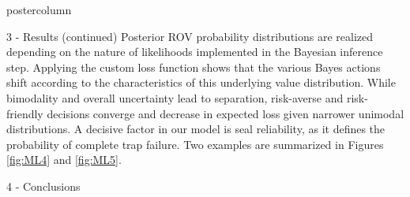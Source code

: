 \documentclass{beamer}
\begin{document}
\begin{frame}
\begin{columns}
\begin{column}{.249\textwidth}
\begin{beamercolorbox}[center]{postercolumn}
\begin{minipage}{.98\textwidth}
{\begin{myblock}{3 - Results (continued)}
Posterior ROV probability distributions are realized depending on the nature of likelihoods implemented in the Bayesian inference step. Applying the custom loss function shows that the various Bayes actions shift according to the characteristics of this underlying	value distribution. While bimodality and overall uncertainty lead to separation, risk-averse and risk-friendly decisions converge and decrease in expected loss given narrower unimodal distributions. A decisive factor in our model is seal reliability, as it defines the probability of complete trap failure. Two examples are summarized in Figures \ref{fig:ML4} and \ref{fig:ML5}.
\end{myblock}
		
\begin{myblock}{4 - Conclusions}


\end{myblock}}
\end{minipage}
\end{beamercolorbox}
\end{column}
\end{columns}
\end{frame}
\end{document}
